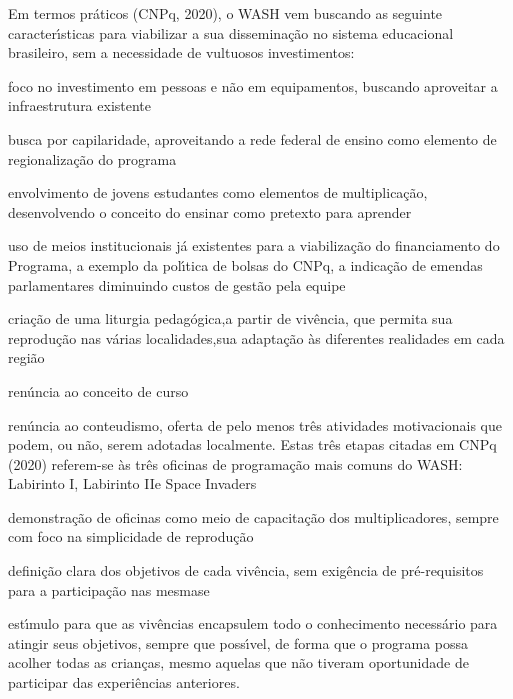 \documentclass[
12pt,		%
openright,	%
twoside,  %
a4paper,			%
chapter=TITLE,		%
english,			%
french,				%
spanish,			%
brazil				%
]{USPSC-classe/USPSC}
\begin{document}
Em termos pr\'aticos (CNPq, 2020), o WASH vem buscando as seguinte caracter\'{\i}sticas para viabilizar a sua dissemina\c{c}\~ao no sistema educacional brasileiro, sem a necessidade de vultuosos investimentos:










\begin{alineas}
\item \textquotedbl foco no investimento em pessoas e n\~ao em equipamentos, buscando aproveitar a infraestrutura existente\textquotedbl 
\item \textquotedbl busca por capilaridade, aproveitando a rede federal de ensino como elemento de regionaliza\c{c}\~ao do programa\textquotedbl 
\item \textquotedbl envolvimento de jovens estudantes como elementos de multiplica\c{c}\~ao, desenvolvendo o conceito do ensinar como pretexto para aprender\textquotedbl 
\item \textquotedbl uso de meios institucionais j\'a existentes para a viabiliza\c{c}\~ao do financiamento do Programa, a exemplo da pol\'{\i}tica de bolsas do CNPq, a indica\c{c}\~ao de emendas parlamentares diminuindo custos de gest\~ao pela equipe\textquotedbl 
\item \textquotedbl cria\c{c}\~ao de uma  \textquotedbl liturgia pedag\'ogica,\textquotedbl  a partir de viv\^encia, que permita sua reprodu\c{c}\~ao nas v\'arias localidades,sua adapta\c{c}\~ao \`as diferentes realidades em cada regi\~ao\textquotedbl 
\item \textquotedbl ren\'uncia ao conceito de curso\textquotedbl 
\item \textquotedbl ren\'uncia ao conteudismo, oferta de pelo menos tr\^es atividades motivacionais que podem, ou n\~ao, serem adotadas localmente\textquotedbl . Estas tr\^es etapas citadas em  CNPq (2020) referem-se \`as tr\^es oficinas de programa\c{c}\~ao mais comuns do WASH: \textquotedbl Labirinto I\textquotedbl , \textquotedbl Labirinto II\textquotedbl  e \textquotedbl Space Invaders\textquotedbl 
\item \textquotedbl demonstra\c{c}\~ao de oficinas como meio de capacita\c{c}\~ao dos multiplicadores, sempre com foco na simplicidade de reprodu\c{c}\~ao\textquotedbl 
\item \textquotedbl defini\c{c}\~ao clara dos objetivos de cada viv\^encia, sem exig\^encia de pr\'e-requisitos para a participa\c{c}\~ao nas mesmas\textquotedbl  e
\item \textquotedbl est\'{\i}mulo para que as viv\^encias encapsulem todo o conhecimento necess\'ario para  atingir  seus objetivos, sempre que poss\'{\i}vel, de forma que o programa possa acolher todas as crian\c{c}as, mesmo aquelas que n\~ao tiveram oportunidade de participar das experi\^encias anteriores.\textquotedbl 
\end{alineas}
\end{document}
